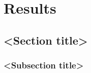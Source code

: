 \chapter{Results}
\lipsum[5]
\section{<Section title>}
\lipsum[6-10]
\subsection{<Subsection title>}
\lipsum[11-13]
